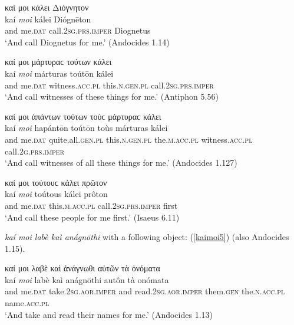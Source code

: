 \begin{exe}
\ex καὶ μοι κάλει Διόγνητον\\
\gll kaí \emph{moi} kálei Diógnēton\\
and me.\textsc{dat} call.\textsc{2sg.prs.imper} Diognetus\\
\trans `And call Diognetus for me.' (Andocides 1.14)\\
\label{kaimoi1}
\end{exe}

\begin{exe}
\ex καί μοι μάρτυραϲ τούτων κάλει\\
\gll kaí \emph{moi} márturas toútōn kálei\\
and me.\textsc{dat} witness.\textsc{acc.pl} this.\textsc{n.gen.pl}
call.\textsc{2sg.prs.imper}\\
\trans `And call witnesses of these things for me.' (Antiphon 5.56)
\label{kaimoi2}
\end{exe}

\begin{exe}
\ex καί μοι ἁπάντων τούτων τοὺϲ μάρτυραϲ κάλει\\
\gll kaí \emph{moi} hapántōn toútōn toùs márturas kálei\\
and me.\textsc{dat} quite.all.\textsc{gen.pl} this.\textsc{n.gen.pl}
the.\textsc{m.acc.pl} witness.\textsc{acc.pl} call.\textsc{2g.prs.imper}\\
\trans `And call witnesses of all these things for me.' (Andocides 1.127)
\label{kaimoi3}
\end{exe}

\begin{exe}
\ex καί μοι τούτουϲ κάλει πρῶτον\\
\gll kaí \emph{moi} toútous kálei prôton\\
and me.\textsc{dat} this.\textsc{m.acc.pl} call.\textsc{2sg.prs.imper}
first\\
\trans `And call these people for me first.' (Isaeus 6.11)
\label{kaimoi4}
\end{exe}

\textit{kaí moi labè kaì anágnōthi} with a following object: (\ref{kaimoi5}) (also Andocides 1.15).

\begin{exe}
\ex καί μοι λαβὲ καὶ ἀνάγνωθι αὐτῶν τὰ ὀνόματα\\
\gll kaí \emph{moi} labè kaì anágnōthi autôn tà onómata\\
and me.\textsc{dat} take.\textsc{2sg.aor.imper} and
read.\textsc{2sg.aor.imper} them.\textsc{gen} the.\textsc{n.acc.pl} name.\textsc{acc.pl}\\
\trans `And take and read their names for me.' (Andocides 1.13)\\
\label{kaimoi5}
\end{exe}

